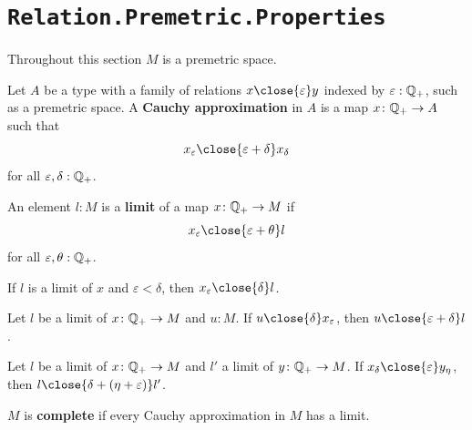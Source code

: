 \section{\texttt{Relation.Premetric.Properties}}

Throughout this section $M$ is a premetric space.

\begin{definition}
  \label{isCauchy}
  Let $A$ be a type with a family of relations $x \close{\varepsilon} y$ indexed by $\varepsilon : \mathbb{Q}_{+}$, such as a premetric space. A \textbf{Cauchy approximation} in $A$ is a map $x \colon \mathbb{Q}_{+} \to A$ such that
  \[
    x_\varepsilon \close{\varepsilon + \delta} x_\delta
  \]
  for all $\varepsilon, \delta : \mathbb{Q}_{+}$.
\end{definition}

\begin{definition}
  \label{isLimit}
  An element $l : M$ is a \textbf{limit} of a map $x \colon \mathbb{Q}_{+} \to M$ if
  \[
    x_\varepsilon \close{\varepsilon + \theta} l
  \]
  for all $\varepsilon, \theta : \mathbb{Q}_{+}$.
\end{definition}

\begin{lemma}
  \label{isLimitApproxLt}
  If $l$ is a limit of $x$ and $\varepsilon < \delta$, then $x_\varepsilon \close{\delta} l$.
\end{lemma}

\begin{lemma}
  \label{isLimApproxPlus}
  Let $l$ be a limit of $x \colon \mathbb{Q}_{+} \to M$ and $u : M$. If $u \close{\delta} x_\varepsilon$, then $u \close{\varepsilon + \delta} l$.
\end{lemma}

\begin{lemma}
  \label{isLimApproxPlus2}
  Let $l$ be a limit of $x \colon \mathbb{Q}_{+} \to M$ and $l'$ a limit of $y \colon \mathbb{Q}_{+} \to M$. If $x_\delta \close{\varepsilon} y_\eta$, then $l \close{\delta + (\eta + \varepsilon)} l'$.
\end{lemma}

\begin{definition}
  \label{isComplete}
  $M$ is \textbf{complete} if every Cauchy approximation in $M$ has a limit.
\end{definition}

